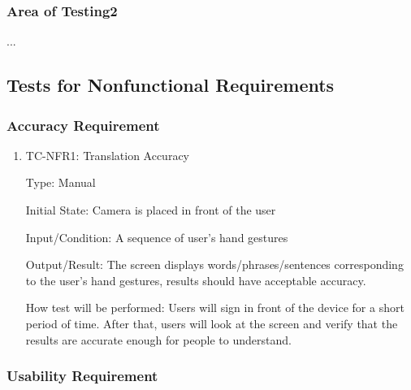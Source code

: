 \documentclass[12pt]{article}
\begin{document}
\subsubsection{Area of Testing2}

...

\subsection{Tests for Nonfunctional Requirements}



\subsubsection{Accuracy Requirement}

\begin{enumerate}

\item{TC-NFR1: Translation Accuracy\\}

Type: Manual
					
Initial State: Camera is placed in front of the user
					
Input/Condition: A sequence of user’s hand gestures
					
Output/Result: The screen displays words/phrases/sentences corresponding to the user's hand gestures, results should have acceptable accuracy.
					
How test will be performed: Users will sign in front of the device for a short period of time. After that, users will look at the screen and verify that the results are accurate enough for people to understand.

\end{enumerate}

\subsubsection{Usability Requirement}
\end{document}
